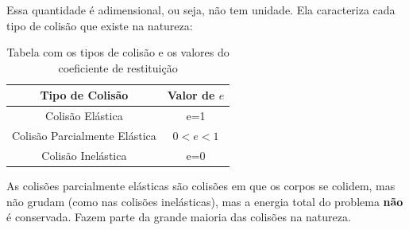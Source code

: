 \documentclass[12pt]{extarticle}
\newcommand{\<}{\langle}
\renewcommand{\>}{\rangle}
\theoremstyle{definition}
\begin{document}
Essa quantidade é adimensional, ou seja, não tem unidade. Ela caracteriza cada tipo de colisão que existe na natureza:
\begin{table}[H]
    \centering
    \begin{tabular}{|c|c|}
    \hline
         \textbf{Tipo de Colisão} & \textbf{Valor de $e$}   \\
         \hline 
         Colisão Elástica & e=1\\
         \hline
         Colisão Parcialmente Elástica & $0<e<1$\\
         \hline
         Colisão Inelástica & e=0\\
         \hline
    \end{tabular}
    \caption{Tabela com os tipos de colisão e os valores do coeficiente de restituição}
    \label{tab:coef_restituicao}
\end{table}

As colisões parcialmente elásticas são colisões em que os corpos se colidem, mas não grudam (como nas colisões inelásticas), mas a energia total do problema \textbf{não} é conservada. Fazem parte da grande maioria das colisões na natureza.
\end{document}
